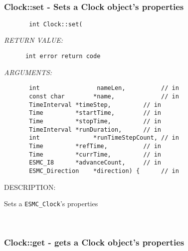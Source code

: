  
\mbox{}\hrulefill\ 
 
\subsubsection [Clock::set] {Clock::set - Sets a Clock object's properties}


  
\begin{verbatim}       int Clock::set(\end{verbatim}{\em RETURN VALUE:}
\begin{verbatim}      int error return code\end{verbatim}{\em ARGUMENTS:}
\begin{verbatim}       int                nameLen,          // in
       const char        *name,             // in
       TimeInterval *timeStep,         // in
       Time         *startTime,        // in
       Time         *stopTime,         // in
       TimeInterval *runDuration,      // in
       int               *runTimeStepCount, // in
       Time         *refTime,          // in
       Time         *currTime,         // in
       ESMC_I8      *advanceCount,     // in
       ESMC_Direction    *direction) {      // in
 \end{verbatim}
{\sf DESCRIPTION:\\ }


        Sets a {\tt ESMC\_Clock}'s properties
   
 
\mbox{}\hrulefill\ 
 
\subsubsection [Clock::get] {Clock::get - gets a Clock object's properties}



